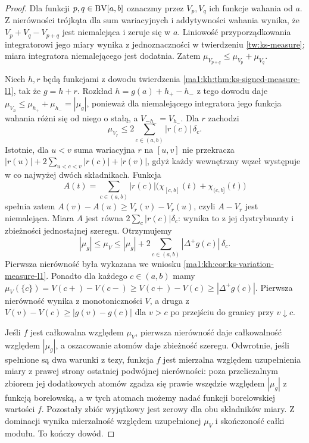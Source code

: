 \begin{proof}
Dla funkcji $p,q\in\mathrm{BV}[a,b]$ oznaczmy przez $V_p,V_q$ ich funkcje wahania od $a$. Z nierówności trójkąta dla sum wariacyjnych i addytywności wahania wynika, że $V_p+V_q-V_{p+q}$ jest niemalejąca i zeruje się w $a$. Liniowość przyporządkowania integratorowi jego miary wynika z jednoznaczności w twierdzeniu \ref{tw:ks-measure}; miara integratora niemalejącego jest dodatnia. Zatem $\mu_{V_{p+q}}\le\mu_{V_p}+\mu_{V_q}$.

Niech $h,r$ będą funkcjami z dowodu twierdzenia \ref{ma1:kh:thm:ks-signed-measure-l1}, tak że $g=h+r$. Rozkład $h=g(a)+h_+-h_-$ z tego dowodu daje $\mu_{V_h}\le\mu_{h_+}+\mu_{h_-}=|\mu_g|$, ponieważ dla niemalejącego integratora jego funkcja wahania różni się od niego o stałą, a $V_{-h_-}=V_{h_-}$. Dla $r$ zachodzi
\[
 \mu_{V_r}\le 2\sum_{c\in(a,b)}|r(c)|\,\delta_c.
\]
Istotnie, dla $u<v$ suma wariacyjna $r$ na $[u,v]$ nie przekracza $|r(u)|+2\sum_{u<c<v}|r(c)|+|r(v)|$, gdyż każdy wewnętrzny węzeł występuje w co najwyżej dwóch składnikach. Funkcja
\[
 A(t)=\sum_{c\in(a,b)}|r(c)|\bigl(\chi_{[c,b]}(t)+\chi_{(c,b]}(t)\bigr)
\]
spełnia zatem $A(v)-A(u)\ge V_r(v)-V_r(u)$, czyli $A-V_r$ jest niemalejąca. Miara $A$ jest równa $2\sum_c|r(c)|\delta_c$: wynika to z jej dystrybuanty i zbieżności jednostajnej szeregu. Otrzymujemy
\[
 |\mu_g|\le\mu_V\le|\mu_g|+2\sum_{c\in(a,b)}|\Delta^+g(c)|\,\delta_c.
\]
Pierwsza nierówność była wykazana we wniosku \ref{ma1:kh:cor:ks-variation-measure-l1}. Ponadto dla każdego $c\in(a,b)$ mamy $\mu_V(\{c\})=V(c+)-V(c-)\ge V(c+)-V(c)\ge|\Delta^+g(c)|$. Pierwsza nierówność wynika z monotoniczności $V$, a druga z $V(v)-V(c)\ge|g(v)-g(c)|$ dla $v>c$ po przejściu do granicy przy $v\downarrow c$.

Jeśli $f$ jest całkowalna względem $\mu_V$, pierwsza nierówność daje całkowalność względem $|\mu_g|$, a oszacowanie atomów daje zbieżność szeregu. Odwrotnie, jeśli spełnione są dwa warunki z tezy, funkcja $f$ jest mierzalna względem uzupełnienia miary z prawej strony ostatniej podwójnej nierówności: poza przeliczalnym zbiorem jej dodatkowych atomów zgadza się prawie wszędzie względem $|\mu_g|$ z funkcją borelowską, a w tych atomach możemy nadać funkcji borelowskiej wartości $f$. Pozostały zbiór wyjątkowy jest zerowy dla obu składników miary. Z dominacji wynika mierzalność względem uzupełnionej $\mu_V$ i skończoność całki modułu. To kończy dowód.
\end{proof}
